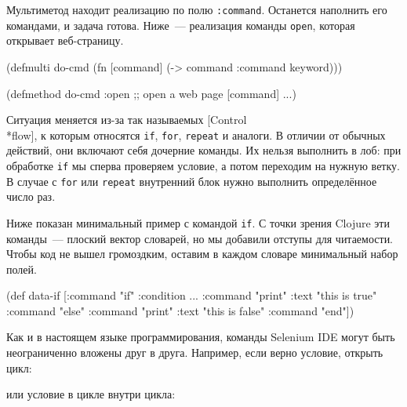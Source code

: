 Мультиметод находит реализацию по полю \verb|:command|. Останется наполнить его
командами, и задача готова. Ниже~--- реализация команды \verb|open|, которая
открывает веб-страницу.

\begin{english}
  \begin{clojure}
(defmulti do-cmd
  (fn [command]
    (-> command :command keyword)))

(defmethod do-cmd :open
  ;; open a web page
  [command]
  ...)
  \end{clojure}
\end{english}

Ситуация меняется из-за так называемых
[Control\\*flow],
к которым относятся \verb|if|, \verb|for|, \verb|repeat| и аналоги. В отличии от
обычных действий, они включают себя дочерние команды. Их нельзя выполнить в лоб:
при обработке \verb|if| мы сперва проверяем условие, а потом переходим на нужную
ветку. В случае с \verb|for| или \verb|repeat| внутренний блок нужно выполнить
определённое число раз.


Ниже показан минимальный пример с командой \texttt{if}. С точки зрения Clojure
эти команды~--- плоский вектор словарей, но мы добавили отступы для
читаемости. Чтобы код не вышел громоздким, оставим в каждом словаре минимальный
набор полей.

\begin{english}
  \begin{clojure}
(def data-if
  [{:command "if" :condition ...}
     {:command "print" :text "this is true"}
   {:command "else"}
     {:command "print" :text "this is false"}
   {:command "end"}])
  \end{clojure}
\end{english}

Как и в настоящем языке программирования, команды Selenium IDE могут быть
неограниченно вложены друг в друга. Например, если верно условие, открыть цикл:

\begin{english}
  \begin{clojure}
  \end{clojure}
\end{english}

\noindent
или условие в цикле внутри цикла:

